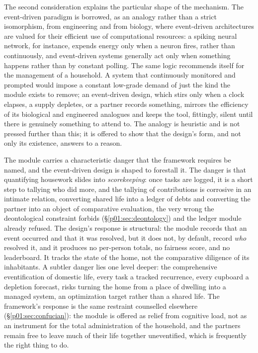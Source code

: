 \documentclass[11pt,a4paper]{article}
\begin{document}
The second consideration explains the particular shape of the mechanism. The event-driven paradigm is borrowed, as an analogy rather than a strict isomorphism, from engineering and from biology, where event-driven architectures are valued for their efficient use of computational resources: a spiking neural network, for instance, expends energy only when a neuron fires, rather than continuously, and event-driven systems generally act only when something happens rather than by constant polling. The same logic recommends itself for the management of a household. A system that continuously monitored and prompted would impose a constant low-grade demand of just the kind the module exists to remove; an event-driven design, which stirs only when a clock elapses, a supply depletes, or a partner records something, mirrors the efficiency of its biological and engineered analogues and keeps the tool, fittingly, silent until there is genuinely something to attend to. The analogy is heuristic and is not pressed further than this; it is offered to show that the design's form, and not only its existence, answers to a reason.

The module carries a characteristic danger that the framework requires be named, and the event-driven design is shaped to forestall it. The danger is that quantifying housework slides into \emph{scorekeeping}: once tasks are logged, it is a short step to tallying who did more, and the tallying of contributions is corrosive in an intimate relation, converting shared life into a ledger of debts and converting the partner into an object of comparative evaluation, the very wrong the deontological constraint forbids (§\ref{p01:sec:deontology}) and the ledger module already refused. The design's response is structural: the module records that an event occurred and that it was resolved, but it does not, by default, record \emph{who} resolved it, and it produces no per-person totals, no fairness score, and no leaderboard. It tracks the state of the home, not the comparative diligence of its inhabitants. A subtler danger lies one level deeper: the comprehensive eventification of domestic life, every task a tracked recurrence, every cupboard a depletion forecast, risks turning the home from a place of dwelling into a managed system, an optimization target rather than a shared life. The framework's response is the same restraint counselled elsewhere (§\ref{p01:sec:confucian}): the module is offered as relief from cognitive load, not as an instrument for the total administration of the household, and the partners remain free to leave much of their life together uneventified, which is frequently the right thing to do.
\end{document}
